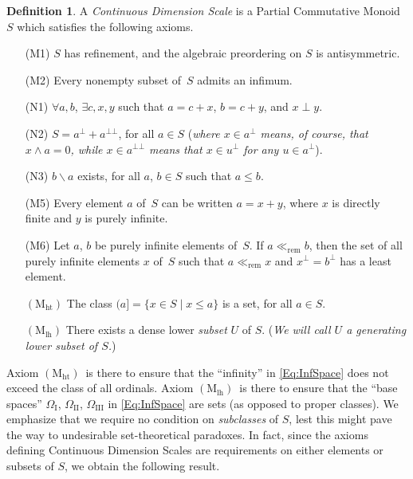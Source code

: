 \documentclass[psamsfonts,reqno]{memo-l}
\theoremstyle{plain}
\theoremstyle{definition}
\newtheorem{definition}[lemma]{Definition}
\theoremstyle{remark}
\numberwithin{equation}{section}
\newcommand{\Mh}{$(\mathrm{M_{ht}})$}
\newcommand{\Ml}{$(\mathrm{M_{lh}})$}
\newcommand{\rem}{\ll_{\mathrm{rem}}}
\newcommand{\sd}{\smallsetminus}
\newcommand{\I}{\mathrm{I}}
\newcommand{\II}{\mathrm{II}}
\newcommand{\III}{\mathrm{III}}
\newcommand{\PCM}{Partial Commutative Mon\-oid}
\newcommand{\set}[1]{\{#1\}}
\newcommand{\setm}[2]{\set{#1\mid#2}}
\begin{document}
\begin{definition}\label{D:DimIntClass}
A \emph{Continuous Dimension Scale}
 is a \PCM~$S$ which satisfies the following axioms.
\begin{itemize}
\item[(M1)] $S$ has refinement, and the algebraic preordering on $S$ is
antisymmetric.

\item[(M2)] Every nonempty subset of~$S$ admits an infimum.

\item[(N1)]
$\forall a,b$, $\exists c,x,y$ such that $a=c+x$, $b=c+y$, and $x\perp y$.

\item[(N2)] $S=a^\bot+a^{\bot\bot}$, for all $a\in S$
(\emph{where $x\in a^\bot$ means, of course, that $x\wedge a=0$, while
$x\in a^{\bot\bot}$ means that $x\in u^\bot$ for any $u\in a^\bot$}).

\item[(N3)] $b\sd a$ exists, for all $a$, $b\in S$ such that $a\leq b$.

\item[(M5)] Every element $a$ of~$S$ can be written $a=x+y$, where $x$ is
directly finite and $y$ is purely infinite.

\item[(M6)] Let $a$, $b$ be purely infinite elements of~$S$.
If $a\rem b$, then the set of all purely infinite elements $x$ of~$S$ such
that $a\rem x$ and $x^\bot=b^\bot$ has a least element.

\item[\Mh] The class $(a]=\setm{x\in S}{x\leq a}$ is a set,
for all $a\in S$.\index{Mzzh@\Mh|ii}

\item[\Ml] There exists a dense lower \emph{subset} $U$ of $S$.
\index{Mzzl@\Ml|ii}
(\emph{We will call $U$ a \emph{generating lower subset} of $S$.})
\end{itemize}
\end{definition}

Axiom \Mh\ is there to ensure that the ``infinity'' in \eqref{Eq:InfSpace}
does not exceed the class of all ordinals. Axiom \Ml\ is there to ensure that
the ``base spaces'' $\Omega_{\I}$, $\Omega_{\II}$, $\Omega_{\III}$ in
\eqref{Eq:InfSpace} are sets (as opposed to proper classes).
We emphasize that we require no condition on \emph{subclasses} of $S$,
lest this might pave the way to undesirable set-the\-o\-ret\-i\-cal
paradoxes. In fact, since the axioms defining Continuous Dimension Scales
are requirements on either elements or subsets of $S$, we obtain the
following result.
\end{document}
